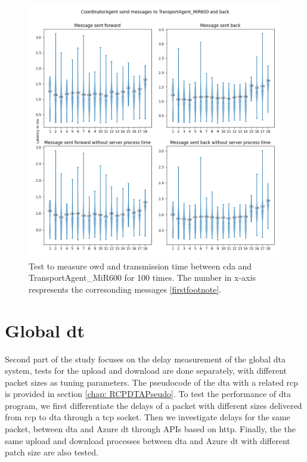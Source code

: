 \begin{figure}[htb]
    \centering
    \includegraphics[width=\textwidth]{figures/tests/usecase/violin_CoordinatorAgent_to_TransportAgent_MiR600.png}\hfill 
    \caption{Test to measure \gls{owd} and transmission time between \gls{cda} and 
    TransportAgent\_MiR600 for 100 times. The number in x-axis respresents the 
    corresonding messages \protect\ref{firstfootnote}.}
    \label{fig: violin-CDA-T600}
\end{figure}




\section{Global \gls{dt}}\label{chap: Result-External}
Second part of the study focuses on the delay measurement of the global \gls{dta} system, tests for the 
upload and download are done separately, with different packet sizes as tuning 
parameters. The pseudocode of the \gls{dta} with a related \gls{rcp} is provided 
in section \ref{chap: RCPDTAPseudo}. To test the performance of \gls{dta} program, 
we first differentiate the delays of a packet with different 
sizes delivered from \gls{rcp} to \gls{dta} through a \gls{tcp} socket. Then we investigate 
delays for the same packet, between \gls{dta} and Azure \gls{dt} through APIs based on 
\gls{http}. Finally, the the same upload and download processes between \gls{dta} and 
Azure \gls{dt} with different patch size are also tested. 

